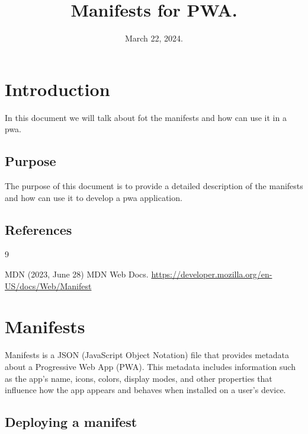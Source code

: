 \documentclass[12pt,a4paper, twosite]{article}
\date{March 22, 2024.}
\title{Manifests for PWA.}
\begin{document}
\maketitle

\newpage
\tableofcontents

\newpage

\section{Introduction}
\label{sec:org60390fa}

In this document we will talk about fot the manifests and how can use it in a pwa.

\subsection{Purpose}
\label{sec:org434c3ef}

The purpose of this document is to provide a detailed description of the manifests and how can use it to develop a pwa application.

\subsection{References}
\label{sec:org62711e0}

\begin{thebibliography}
{9}

 MDN (2023, June 28) MDN Web Docs.  \url{https://developer.mozilla.org/en-US/docs/Web/Manifest}



\end{thebibliography}


\section{Manifests}
\label{sec:orgc1c4017}
Manifests is a JSON (JavaScript Object Notation) file that provides metadata about a Progressive Web App (PWA). This metadata includes information such as the app's name, icons, colors, display modes, and other properties that influence how the app appears and behaves when installed on a user's device.



\subsection{Deploying a manifest}
\end{document}
